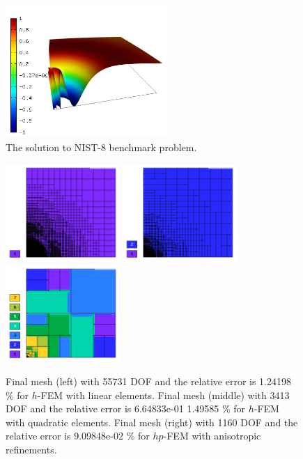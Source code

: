 \documentclass[12pt]{elsarticle}
\begin{document}
\begin{figure}[H]
\centering
\vspace{-3mm}
\includegraphics[height=5cm]{nist/nist-8/solution.png}
\vspace{-3mm}
\caption{The solution to NIST-8 benchmark problem.}
\vspace{-4mm}
\label{fig:sln-nist08}
\end{figure}


\begin{figure}[H]
\centering
\includegraphics[height=3.7cm]{nist/nist-8/mesh_h1_aniso.png}
\includegraphics[height=3.7cm]{nist/nist-8/mesh_h2_aniso.png}
\includegraphics[height=3.7cm]{nist/nist-8/mesh_hp_aniso.png}
\caption{
Final mesh (left) with 55731 DOF and the relative error is 1.24198 \% for $h$-FEM with linear elements.
Final mesh (middle) with 3413 DOF and the relative error is 6.64833e-01 1.49585 \% for $h$-FEM with quadratic elements.
Final mesh (right) with 1160 DOF and the relative error is 9.09848e-02 \% for $hp$-FEM with anisotropic refinements.}
\label{fig:nist-8-hp-aniso}
\end{figure}
\end{document}
